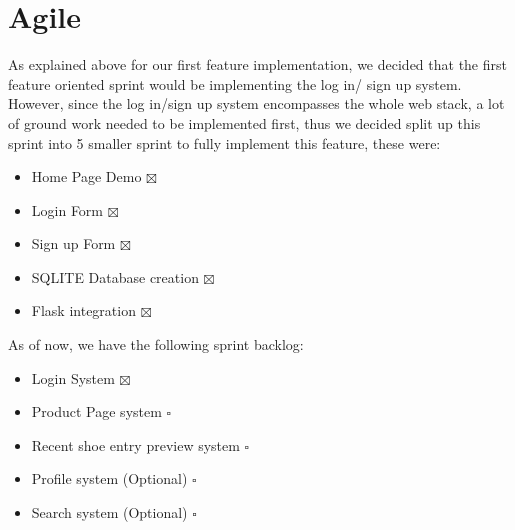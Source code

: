 \section{Agile}
As explained above for our first feature implementation, we decided that the first feature oriented sprint would be implementing the log in/ sign up system. However, since the log in/sign up system encompasses the whole web stack, a lot of ground work needed to be implemented first, thus we decided split up this sprint into 5 smaller sprint to fully implement this feature, these were:
\begin{itemize}
  \item Home Page Demo $\boxtimes$
  \item Login Form $\boxtimes$
  \item Sign up Form $\boxtimes$
  \item SQLITE Database creation $\boxtimes$
  \item Flask integration $\boxtimes$
\end{itemize}
As of now, we have the following sprint backlog:
\begin{itemize}
  \item Login System $\boxtimes$
  \item Product Page system $\square$
  \item Recent shoe entry preview system $\square$
  \item Profile system (Optional) $\square$
  \item Search system (Optional) $\square$
\end{itemize}
